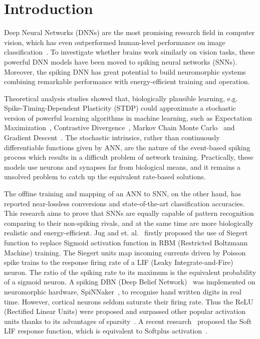\documentclass[runningheads,a4paper]{llncs}
\begin{document}
\section{Introduction}

Deep Neural Networks (DNNs) are the most promising research field in computer vision, which has even outperformed human-level performance on image classification~\cite{he2015delving}.
To investigate whether brains work similarly on vision tasks, these powerful DNN models have been moved to spiking neural networks (SNNs).
Moreover, the spiking DNN has great potential to build neuromorphic systems combining remarkable performance with energy-efficient training and operation.

Theoretical analysis studies showed that, biologically plausible learning, e.g. Spike-Timing-Dependent Plasticity (STDP) could approximate a stochastic version of powerful learning algorithms in machine learning, such as Expectation Maximization~\cite{nessler2013bayesian}, Contrastive Divergence~\cite{neftci2013event}, Markov Chain Monte Carlo~\cite{buesing2011neural} and Gradient Descent~\cite{o2016deep}.
The stochastic intrinsics, rather than continuously differentiable functions given by ANN, are the nature of the event-based spiking process which results in a difficult problem of network training.
Practically, these models use neurons and synapses far from biological means, and it remains a unsolved problem to catch up the equivalent rate-based solutions.
 
The offline training and mapping of an ANN to SNN, on the other hand, has reported near-lossless conversions and state-of-the-art classification accuracies.
This research aims to prove that SNNs are equally capable of pattern recognition comparing to their non-spiking rivals, and at the same time are more biologically realistic and energy-efficient.
Jug and et. al.~\cite{Jug_etal_2012} firstly proposed the use of Siegert function to replace Sigmoid activation function in RBM (Restricted Boltzmann Machine) training.
The Siegert units map incoming currents driven by Poisson spike trains to the response firing rate of a LIF (Leaky Integrate-and-Fire) neuron.
The ratio of the spiking rate to its maximum is the equivalent probability of a sigmoid neuron.
A spiking DBN (Deep Belief Network)~\cite{Stromatias2015scalable} was implemented on neuromorphic hardware, SpiNNaker~\cite{furber2014spinnaker}, to recognise hand written digits in real time.
However, cortical neurons seldom saturate their firing rate.
Thus the ReLU (Rectified Linear Units) were proposed and surpassed other popular activation units thanks to its advantages of sparsity~\cite{glorot2011deep}.
A recent research~\cite{hunsberger2015spiking} proposed the Soft LIF response function, which is equivalent to Softplus activation~\cite{dugas2001incorporating}.
\end{document}
